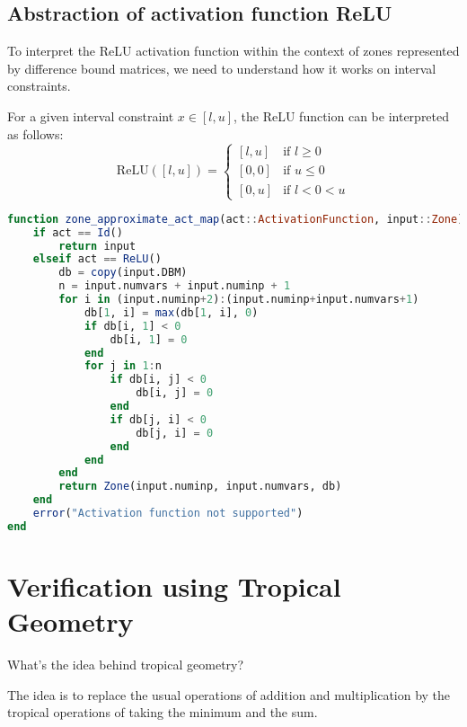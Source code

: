 \documentclass{article}
\begin{document}
\subsection{Abstraction of activation function ReLU}

To interpret the ReLU activation function within the context of zones represented by difference bound matrices, we need to understand how it works on interval constraints.

For a given interval constraint \(x \in [l, u] \), the ReLU function can be interpreted as follows:
\[
    \text{ReLU}([l, u]) = \begin{cases}
        [l, u] & \text{if } l \geq 0 \\
        [0, 0] & \text{if } u \leq 0 \\
        [0, u] & \text{if } l < 0 < u
    \end{cases}
\]



\begin{lstlisting}[language= Julia]
function zone_approximate_act_map(act::ActivationFunction, input::Zone)
    if act == Id()
        return input
    elseif act == ReLU()
        db = copy(input.DBM)
        n = input.numvars + input.numinp + 1
        for i in (input.numinp+2):(input.numinp+input.numvars+1)
            db[1, i] = max(db[1, i], 0)
            if db[i, 1] < 0
                db[i, 1] = 0
            end
            for j in 1:n
                if db[i, j] < 0
                    db[i, j] = 0
                end
                if db[j, i] < 0
                    db[j, i] = 0
                end
            end
        end
        return Zone(input.numinp, input.numvars, db)
    end
    error("Activation function not supported")
end
\end{lstlisting}


\newpage
\section{Verification using Tropical Geometry}

What's the idea behind tropical geometry?

The idea is to replace the usual operations of addition and multiplication by the tropical operations of taking the minimum and the sum.
\end{document}
